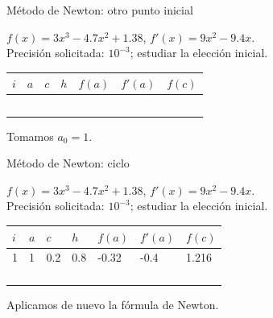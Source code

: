 \documentclass[original_version/main.tex]{subfiles}
\begin{document}
\begin{frame}[t]{Método de Newton: otro punto inicial}
\begin{minipage}[t][17mm]{\textwidth}\small
$f(x)=3x^3-4.7x^2+1.38$, $f'(x)=9x^2-9.4x$.\\
Precisión solicitada: $10^{-3}$; estudiar la elección inicial.
\end{minipage}\begingroup\scriptsize\setlength{\tabcolsep}{2pt}
\begin{center}\begin{tabular}{|C{.04\textwidth}|*{6}{C{.135\textwidth}|}}\hline
$i$&$a$&$c$&$h$&$f(a)$&$f'(a)$&$f(c)$\\\hline
\rule{0pt}{5mm}&&&&&&\\\hline
\rule{0pt}{5mm}&&&&&&\\\hline
\rule{0pt}{5mm}&&&&&&\\\hline
\rule{0pt}{5mm}&&&&&&\\\hline
\rule{0pt}{5mm}&&&&&&\\\hline
\end{tabular}\end{center}\endgroup\small Tomamos $a_0=1$.
\end{frame}
\begin{frame}[t]{Método de Newton: ciclo}
\begin{minipage}[t][17mm]{\textwidth}\small
$f(x)=3x^3-4.7x^2+1.38$, $f'(x)=9x^2-9.4x$.\\
Precisión solicitada: $10^{-3}$; estudiar la elección inicial.
\end{minipage}\begingroup\scriptsize\setlength{\tabcolsep}{2pt}
\begin{center}\begin{tabular}{|C{.04\textwidth}|*{6}{C{.135\textwidth}|}}\hline
$i$&$a$&$c$&$h$&$f(a)$&$f'(a)$&$f(c)$\\\hline
\rule{0pt}{5mm}1&1&0.2&0.8&-0.32&-0.4&1.216\\\hline
\rule{0pt}{5mm}&&&&&&\\\hline
\rule{0pt}{5mm}&&&&&&\\\hline
\rule{0pt}{5mm}&&&&&&\\\hline
\rule{0pt}{5mm}&&&&&&\\\hline
\end{tabular}\end{center}\endgroup\small Aplicamos de nuevo la fórmula de Newton.
\end{frame}
\end{document}
